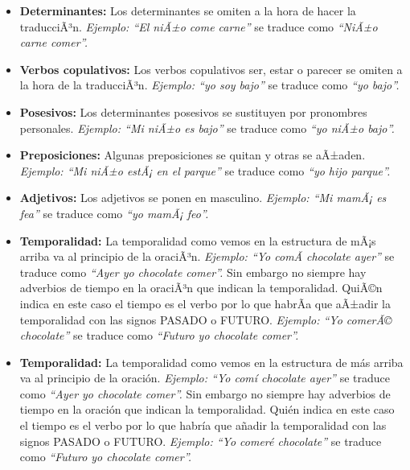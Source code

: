 \begin{itemize}
	
	\item \textbf{Determinantes:} Los determinantes se omiten a la hora de hacer la traducciÃ³n. \textit{Ejemplo: ``El niÃ±o come carne''} se traduce como \textit{``NiÃ±o carne comer''.}
	\item \textbf{Verbos copulativos:} Los verbos copulativos ser, estar o parecer se omiten a la hora de la traducciÃ³n. \textit{Ejemplo: ``yo soy bajo''} se traduce como \textit{``yo bajo''.}
	
	\item \textbf{Posesivos:} Los determinantes posesivos se sustituyen por pronombres personales.  \textit{Ejemplo: ``Mi niÃ±o es bajo''} se traduce como \textit{``yo niÃ±o bajo''.}
	
	\item \textbf{Preposiciones:} Algunas preposiciones se quitan y otras se aÃ±aden.  \textit{Ejemplo: ``Mi niÃ±o estÃ¡ en el parque''} se traduce como \textit{``yo hijo parque''.}
	
	\item \textbf{Adjetivos:} Los adjetivos se ponen en masculino.  \textit{Ejemplo: ``Mi mamÃ¡ es fea''} se traduce como \textit{``yo mamÃ¡ feo''.}
	

	\item \textbf{Temporalidad:} La temporalidad como vemos en la estructura de mÃ¡s arriba va al principio de la oraciÃ³n. \textit{Ejemplo: ``Yo comÃ­ chocolate ayer''} se traduce como \textit{``Ayer yo chocolate comer''.} Sin embargo no siempre hay adverbios de tiempo en la oraciÃ³n que indican la temporalidad. QuiÃ©n indica en este caso el tiempo es el verbo por lo que habrÃ­a que aÃ±adir la temporalidad con las signos PASADO o FUTURO.
	\textit{Ejemplo: ``Yo comerÃ© chocolate''} se traduce como \textit{``Futuro yo chocolate comer''.}
		

	\item \textbf{Temporalidad:} La temporalidad como vemos en la estructura de más arriba va al principio de la oración. \textit{Ejemplo: ``Yo comí chocolate ayer''} se traduce como \textit{``Ayer yo chocolate comer''.} Sin embargo no siempre hay adverbios de tiempo en la oración que indican la temporalidad. Quién indica en este caso el tiempo es el verbo por lo que habría que añadir la temporalidad con las signos PASADO o FUTURO.
	\textit{Ejemplo: ``Yo comeré chocolate''} se traduce como \textit{``Futuro yo chocolate comer''.}
	

\end{itemize}


